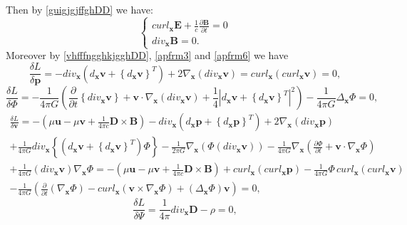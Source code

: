 \documentclass{article}
\theoremstyle{definition}
\theoremstyle{remark}
\renewcommand{\vec}[1]{\mathbf{#1}}
\newcommand{\er}{\eqref}
\newcommand{\er}{\eqref}
\begin{document}
Then by \er{guigjgjffghDD} we have:
\begin{equation}\label{guigjgjffghjhkkgDD}
\begin{cases}
curl_{\vec x}\vec E+\frac{1}{c}\frac{\partial\vec B}{\partial t}=0\\
div_{\vec x}\vec B=0.
\end{cases}
\end{equation}
Moreover by \er{vhfffngghkjgghDD},  \er{apfrm3} and \er{apfrm6} we
have
\begin{equation}\label{vhfffngghkjgghggtghjgfhjyuiutDD}
\frac{\delta L}{\delta \vec p}=-div_{\vec x}\left(d_{\vec x}\vec
v+\left\{d_{\vec x}\vec v\right\}^T\right)+2\nabla_{\vec
x}\left(div_{\vec x}\vec v\right)=curl_{\vec x}\left(curl_{\vec
x}\vec v\right)=0,
\end{equation}
\begin{equation}\label{vhfffngghkjgghggtghjgfhjDD}
\frac{\delta L}{\delta \Phi}=-\frac{1}{4\pi
G}\left(\frac{\partial}{\partial t}\left\{div_{\vec x}\vec
v\right\}+\vec v\cdot\nabla_{\vec x}\left(div_{\vec x}\vec
v\right)+\frac{1}{4}\left|d_{\vec x}\vec v+\left\{d_{\vec x}\vec
v\right\}^T\right|^2\right)-\frac{1}{4\pi G}\Delta_{\vec x}\Phi=0,
\end{equation}
\begin{multline}\label{vhfffngghkjgghggtghjgfhjoyuiyuDD}
\frac{\delta L}{\delta \vec v}=-\left(\mu\vec u-\mu\vec
v+\frac{1}{4\pi c}\vec D\times\vec B\right)-div_{\vec
x}\left(d_{\vec x}\vec p+\left\{d_{\vec x}\vec
p\right\}^T\right)+2\nabla_{\vec x}\left(div_{\vec x}\vec
p\right)\\+\frac{1}{4\pi G}div_{\vec x}\left\{\left(d_{\vec x}\vec
v+\left\{d_{\vec x}\vec v\right\}^T\right)\Phi\right\}-\frac{1}{2\pi
G}\nabla_{\vec x}\left(\Phi\left(div_{\vec x}\vec
v\right)\right)-\frac{1}{4\pi G}\nabla_{\vec x}\left(\frac{\partial
\Phi}{\partial t}+\vec v\cdot\nabla_{\vec x}
\Phi\right)\\+\frac{1}{4\pi G}\left(div_{\vec x}\vec
v\right)\nabla_{\vec x}\Phi=-\left(\mu\vec u-\mu\vec v+\frac{1}{4\pi
c}\vec D\times\vec B\right)+curl_{\vec x}\left(curl_{\vec x}\vec
p\right)-\frac{1}{4\pi G}\Phi\,curl_{\vec x}\left(curl_{\vec x}\vec
v\right)\\-\frac{1}{4\pi G}\left(\frac{\partial}{\partial
t}\left(\nabla_{\vec x}\Phi\right)-curl_{\vec x}\left(\vec
v\times\nabla_{\vec x}\Phi\right)+\left(\Delta_{\vec
x}\Phi\right)\vec v\right)=0,
\end{multline}
\begin{equation}\label{vhfffngghkjgghggtghjgfhjhjkghghDD}
\frac{\delta L}{\delta \Psi}=\frac{1}{4\pi}div_{\vec x}\vec
D-\rho=0,
\end{equation}
\end{document}
